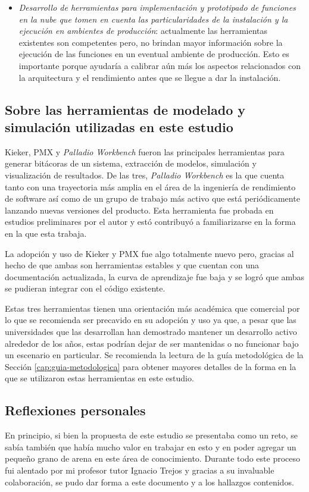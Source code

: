 \begin{itemize}
    \item \emph{Desarrollo de herramientas para implementación y prototipado de funciones en la nube que tomen en cuenta las particularidades de la instalación y la ejecución en ambientes de producción}: actualmente las herramientas existentes son competentes pero, no brindan mayor información sobre la ejecución de las funciones en un eventual ambiente de producción. Esto es importante porque ayudaría a calibrar aún más los aspectos relacionados con la arquitectura y el rendimiento antes que se llegue a dar la instalación.
\end{itemize}

\subsection{Sobre las herramientas de modelado y simulación utilizadas en este estudio}
Kieker, PMX y \emph{Palladio Workbench} fueron las principales herramientas para generar bitácoras de un sistema, extracción de modelos, simulación y visualización de resultados. De las tres, \emph{Palladio Workbench} es la que cuenta tanto con una trayectoria más amplia en el área de la ingeniería de rendimiento de software así como de un grupo de trabajo más activo que está periódicamente lanzando nuevas versiones del producto. Esta herramienta fue probada en estudios preliminares por el autor y estó contribuyó a familiarizarse en la forma en la que esta trabaja.

La adopción y uso de Kieker y PMX fue algo totalmente nuevo pero, gracias al hecho de que ambas son herramientas estables y que cuentan con una documentación actualizada, la curva de aprendizaje fue baja y se logró que ambas se pudieran integrar con el código existente.

Estas tres herramientas tienen una orientación más académica que comercial por lo que se recomienda ser precavido en su adopción y uso ya que, a pesar que las universidades que las desarrollan han demostrado mantener un desarrollo activo alrededor de los años, estas podrían dejar de ser mantenidas o no funcionar bajo un escenario en particular. Se recomienda la lectura de la guía metodológica de la Sección \ref{cap:guia-metodologica} para obtener mayores detalles de la forma en la que se utilizaron estas herramientas en este estudio.

\subsection{Reflexiones personales}
En principio, si bien la propuesta de este estudio se presentaba como un reto, se sabía también que había mucho valor en trabajar en esto y en poder agregar un pequeño grano de arena en este área de conocimiento. Durante todo este proceso fui alentado por mi profesor tutor Ignacio Trejos y gracias a su invaluable colaboración, se pudo dar forma a este documento y a los hallazgos contenidos.

